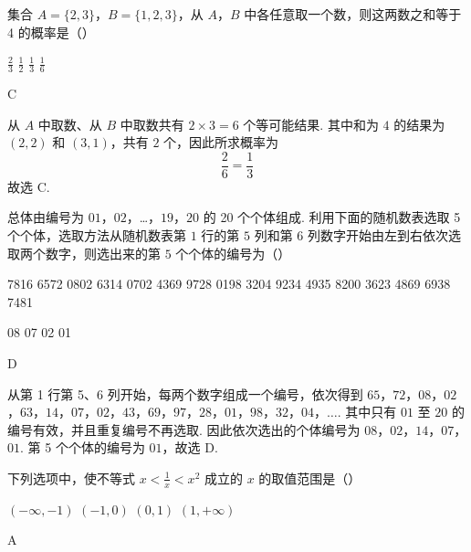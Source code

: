 \begin{problem}
集合 \(A = \{2, 3\}\)，\(B = \{1, 2, 3\}\)，从 \(A\)，\(B\) 中各任意取一个数，则这两数之和等于 4 的概率是（\quad）

\choices
    {\( \frac{2}{3} \)}
    {\( \frac{1}{2} \)}
    {\( \frac{1}{3} \)}
    {\( \frac{1}{6} \)}
\end{problem}

\begin{answer}
C
\end{answer}

\begin{solution}
从 \(A\) 中取数、从 \(B\) 中取数共有 \(2\times3=6\) 个等可能结果. 其中和为 \(4\) 的结果为 \((2,2)\) 和 \((3,1)\)，共有 \(2\) 个，因此所求概率为
\[
\frac{2}{6}=\frac{1}{3}
\]
故选 C.
\end{solution}

\begin{problem}
总体由编号为 \(01\)，\(02\)，…，\(19\)，\(20\) 的 20 个个体组成. 利用下面的随机数表选取 5 个个体，选取方法从随机数表第 \(1\) 行的第 \(5\) 列和第 \(6\) 列数字开始由左到右依次选取两个数字，则选出来的第 \(5\) 个个体的编号为（\quad）

7816 6572 0802 6314 0702 4369 9728 0198 3204 9234 4935 8200 3623 4869 6938 7481

\choices
    {08}
    {07}
    {02}
    {01}
\end{problem}

\begin{answer}
D
\end{answer}

\begin{solution}
从第 1 行第 5、6 列开始，每两个数字组成一个编号，依次得到
\(65\)，\(72\)，\(08\)，\(02\)，\(63\)，\(14\)，\(07\)，\(02\)，\(43\)，\(69\)，\(97\)，\(28\)，\(01\)，\(98\)，\(32\)，\(04\)，\(\ldots\).
其中只有 \(01\) 至 \(20\) 的编号有效，并且重复编号不再选取. 因此依次选出的个体编号为
\(08\)，\(02\)，\(14\)，\(07\)，\(01\).
第 5 个个体的编号为 \(01\)，故选 D.
\end{solution}

\begin{problem}
下列选项中，使不等式 \(x < \frac{1}{x} < x^2\) 成立的 \(x\) 的取值范围是（\quad）

\choices
    {\((- \infty, -1)\)}
    {\((-1,0)\)}
    {\((0,1)\)}
    {\((1, +\infty)\)}
\end{problem}

\begin{answer}
A
\end{answer}

